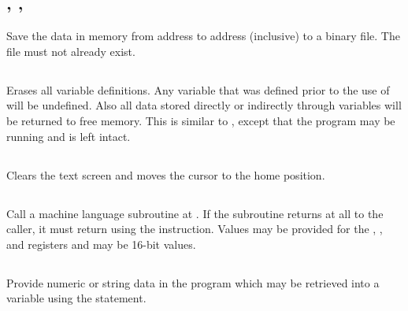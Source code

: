 \documentclass{report}
\begin{document}
    \subsection*{ , , }

    Save the data in memory from address  to address  (inclusive) to a binary file.
    The file must not already exist.

    \subsection*{}

    Erases all variable definitions. Any variable that was defined prior to the use of  will be undefined.
    Also all data stored directly or indirectly through variables will be returned to free memory. This is similar to
    , except that the program may be running and is left intact.

    \subsection*{}

    Clears the text screen and moves the cursor to the home position.

    \subsection*{}

    Call a machine language subroutine at . If the subroutine returns at all to the caller, it
    must return using the  instruction. Values may be provided for the , , and
     registers and may be 16-bit values.

    \subsection*{}

    Provide numeric or string data in the program which may be retrieved into a variable using the  statement.

    \subsection*{ }
\end{document}
